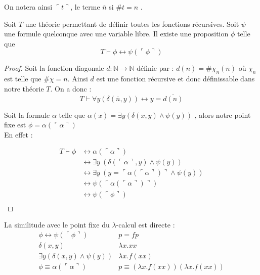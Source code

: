 On notera ainsi $\ulcorner t \urcorner$, le terme $\overline{n}$  si 
$\# t =n$ . 


\begin{theoreme}
	Soit $T$ une théorie permettant de définir toutes les fonctions récursives.
	Soit $\psi$ une formule quelconque avec une variable libre. Il existe une proposition $\phi$ telle que
	$$ T \vdash \phi \leftrightarrow \psi (\ulcorner \phi\urcorner ) $$
\end{theoreme}
\begin{proof}
	Soit la fonction diagonale $d : \mathbb{N} \rightarrow \mathbb{N} $ définie par :
	$ d(n)= \# \chi _n(\overline{n})$ où $\chi_n$ est telle que $\# \chi =n$. Ainsi $d$ 
	est une fonction récursive et donc définissable dans notre théorie $T$. On a donc :
	$$T \vdash \forall y (\delta(\overline{n}, y)) \leftrightarrow y=\overline{d(n)} $$

	Soit la formule $\alpha$ telle que $\alpha (x)=\exists y (\delta(x,y) \land \psi(y))$
	, alors notre point fixe est $\phi = \alpha (\ulcorner \alpha \urcorner )$ \\
	En effet :

	\begin{align*}
	 T \vdash \phi & \leftrightarrow \alpha(\ulcorner \alpha \urcorner ) \\
	                 & \leftrightarrow \exists y\ (\delta( \ulcorner \alpha \urcorner , y) \land \psi (y)) \\
	                 & \leftrightarrow \exists y\ (y=\ulcorner \alpha(\ulcorner \alpha  \urcorner)\urcorner \land \psi (y)) \\
	                 & \leftrightarrow \psi (\ulcorner \alpha(\ulcorner \alpha \urcorner)\urcorner)  \\
	                 & \leftrightarrow \psi (\ulcorner \phi \urcorner ) \\
	\end{align*}
\end{proof}


La similitude avec le point fixe du $\lambda$-calcul est directe :
$$
\begin{array}{c|c}
 \phi \leftrightarrow \psi (\ulcorner \phi\urcorner ) & p = fp \\
 \delta(x,y) & \lambda x.xx \\
 \exists y (\delta(x,y) \land \psi(y)) & \lambda x.f (x x) \\
 \phi \equiv \alpha(\ulcorner \alpha \urcorner) & p \equiv (\lambda x.f(xx)) (\lambda x.f(xx)) \\
\end{array}
$$

